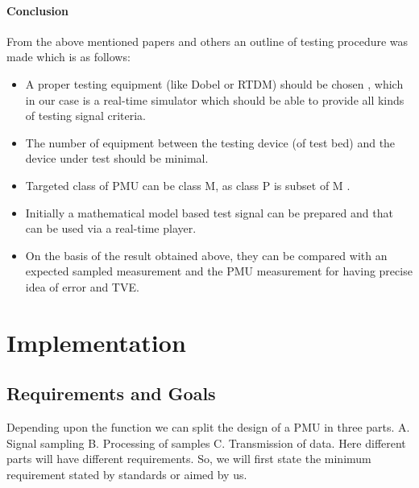 \subsubsection{Conclusion}
From the above mentioned papers and others an outline of testing procedure was made which is as follows:
\begin{itemize}
	\item A proper testing equipment (like Dobel or RTDM) should be chosen \cite{Paper:saugata}, which in our case is a real-time simulator which should be able to provide all kinds of testing signal criteria.
	\item The number of equipment between the testing device (of test bed) and the device under test should be minimal.
	\item Targeted class of PMU can be class M, as class P is subset of M \cite{paper:nrendra}.
	\item Initially a mathematical model based test signal can be prepared and that can be used via a real-time player.
	\item On the basis of the result obtained above, they can be compared with an expected sampled measurement and the PMU measurement for having precise idea of error and TVE.
\end{itemize}


\chapter{Implementation}
\section{Requirements and Goals}
Depending upon the function we can split the design of a PMU in three parts. 
A. Signal sampling
B. Processing of samples  
C. Transmission of data.
Here different parts will have different requirements. So, we will first state the minimum requirement stated by standards or aimed by us.

